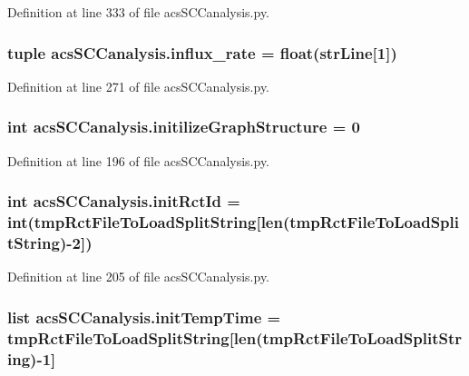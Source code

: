 Definition at line 333 of file acs\-S\-C\-Canalysis.\-py.

\hypertarget{a00097_a3a8adee26325d72aca909e91b0fd3ea5}{
\subsubsection[{influx\-\_\-rate}]{\setlength{\rightskip}{0pt plus 5cm}tuple acs\-S\-C\-Canalysis.\-influx\-\_\-rate = float({\bf str\-Line}\mbox{[}1\mbox{]})}}\label{a00097_a3a8adee26325d72aca909e91b0fd3ea5}


Definition at line 271 of file acs\-S\-C\-Canalysis.\-py.

\hypertarget{a00097_ac6ad18bfc83e8ea3254897d46f990855}{
\subsubsection[{initilize\-Graph\-Structure}]{\setlength{\rightskip}{0pt plus 5cm}int acs\-S\-C\-Canalysis.\-initilize\-Graph\-Structure = 0}}\label{a00097_ac6ad18bfc83e8ea3254897d46f990855}


Definition at line 196 of file acs\-S\-C\-Canalysis.\-py.

\hypertarget{a00097_a212643643fc6b002e8797f16633bb16d}{
\subsubsection[{init\-Rct\-Id}]{\setlength{\rightskip}{0pt plus 5cm}int acs\-S\-C\-Canalysis.\-init\-Rct\-Id = int({\bf tmp\-Rct\-File\-To\-Load\-Split\-String}\mbox{[}len({\bf tmp\-Rct\-File\-To\-Load\-Split\-String})-\/2\mbox{]})}}\label{a00097_a212643643fc6b002e8797f16633bb16d}


Definition at line 205 of file acs\-S\-C\-Canalysis.\-py.

\hypertarget{a00097_adc4403c4cfe080918c8b9da692c50509}{
\subsubsection[{init\-Temp\-Time}]{\setlength{\rightskip}{0pt plus 5cm}list acs\-S\-C\-Canalysis.\-init\-Temp\-Time = {\bf tmp\-Rct\-File\-To\-Load\-Split\-String}\mbox{[}len({\bf tmp\-Rct\-File\-To\-Load\-Split\-String})-\/1\mbox{]}}}\label{a00097_adc4403c4cfe080918c8b9da692c50509}



